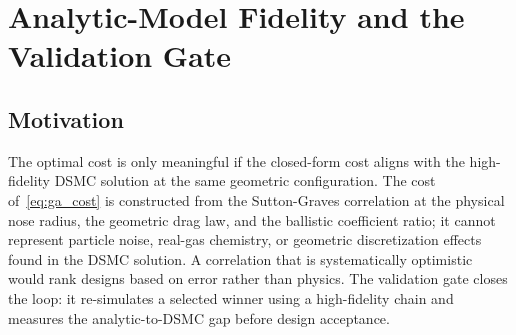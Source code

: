 \section{Analytic-Model Fidelity and the Validation Gate}
\label{sec:hybrid_gate}

\subsection{Motivation}
The optimal cost is only meaningful if the closed-form cost aligns with the high-fidelity DSMC solution at the same geometric configuration. The cost of~\eqref{eq:ga_cost} is constructed from the Sutton-Graves correlation at the physical nose radius, the geometric drag law, and the ballistic coefficient ratio; it cannot represent particle noise, real-gas chemistry, or geometric discretization effects found in the DSMC solution. A correlation that is systematically optimistic would rank designs based on error rather than physics. The validation gate closes the loop: it re-simulates a selected winner using a high-fidelity chain and measures the analytic-to-DSMC gap before design acceptance.

